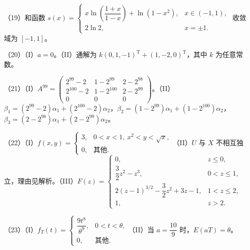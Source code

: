 \documentclass[UTF8,12pt]{ctexart}
\begin{document}
（19）和函数 \(\displaystyle s(x)=\begin{cases}x\ln(\dfrac{\displaystyle 1+x}{\displaystyle 1-x})+\ln(1-x^2),\allowbreak &x\in(-1,\allowbreak 1),\allowbreak \\2\ln2,\allowbreak &x=\pm1.\end{cases}\) 收敛域为 \(\displaystyle [-1,\allowbreak 1]\)。


（20）（I）\(\displaystyle a=0\)。（II）通解为 \(\displaystyle k(0,\allowbreak 1,\allowbreak -1)^{\mathrm T}+(1,\allowbreak -2,\allowbreak 0)^{\mathrm T}\)，其中 \(\displaystyle k\) 为任意常数。


（21）（I）\(\displaystyle A^{99}=\begin{pmatrix}2^{99}-2&1-2^{99}&2-2^{98}\\2^{100}-2&1-2^{100}&2-2^{99}\\0&0&0\end{pmatrix}\)。（II）\(\displaystyle \beta_1=(2^{99}-2)\alpha_1+(2^{100}-2)\alpha_2\)，\(\displaystyle \beta_2=(1-2^{99})\alpha_1+(1-2^{100})\alpha_2\)，\(\displaystyle \beta_3=(2-2^{98})\alpha_1+(2-2^{99})\alpha_2\)。


（22）（I）\(\displaystyle f(x,\allowbreak y)=\begin{cases}3,\allowbreak &0<x<1,\allowbreak \ x^2<y<\sqrt x,\allowbreak \\0,\allowbreak &\text{其他}.\end{cases}\)（II）\(\displaystyle U\) 与 \(\displaystyle X\) 不相互独立，理由见解析。（III）\(\displaystyle F(z)=\begin{cases}0,\allowbreak &z\le0,\allowbreak \\\dfrac{\displaystyle 3}{\displaystyle 2}z^2-z^3,\allowbreak &0<z\le1,\allowbreak \\2(z-1)^{3/2}-\dfrac{\displaystyle 3}{\displaystyle 2}z^2+3z-1,\allowbreak &1<z\le2,\allowbreak \\1,\allowbreak &z>2.\end{cases}\)


（23）（I）\(\displaystyle f_T(t)=\begin{cases}\dfrac{\displaystyle 9t^8}{\displaystyle \theta^9},\allowbreak &0<t<\theta,\allowbreak \\0,\allowbreak &\text{其他}.\end{cases}\)（II）当 \(\displaystyle a=\dfrac{\displaystyle 10}{\displaystyle 9}\) 时，\(\displaystyle E(aT)=\theta\)。


\clearpage
\end{document}
